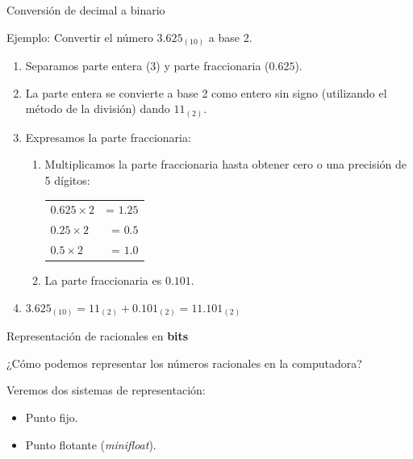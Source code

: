 \documentclass[11pt,a4paper,spanish]{beamer}
\begin{document}
\begin{frame}{Conversión de decimal a binario}

    Ejemplo: Convertir el número \(3.625_{(10)}\) a base 2.

\begin{enumerate}
    \item Separamos parte entera (3) y parte fraccionaria (\(0.625\)).

\item La parte entera se convierte a base 2 como entero sin signo (utilizando
    el método de la división) dando \(11_{(2)}\).\pause

\item Expresamos la parte fraccionaria:

    \begin{enumerate}

    \item Multiplicamos la parte fraccionaria hasta obtener cero o una
        precisión de 5 dígitos:
        \pause
        \begin{tabular}[t]{ l r }

            \(0.625{\times}2\) & = \(1.25\)\\\pause

            \(0.25{\times}2\) & = \(0.5\)\\\pause

            \(0.5{\times}2\) & = \(1.0\)\\

        \end{tabular}\pause

    \item La parte fraccionaria es \(0.101\).

    \end{enumerate}\pause

\item \(3.625_{(10)}=11_{(2)} + 0.101_{(2)} = 11.101_{(2)}\)

\end{enumerate}
\end{frame}

\begin{frame}{Representación de racionales en \textbf{bits}}

    ¿Cómo podemos representar los números racionales en la computadora?

    Veremos dos sistemas de representación:
\begin{itemize}
    \item Punto fijo.
    \item Punto flotante (\emph{minifloat}).
\end{itemize}
\end{frame}
\end{document}

